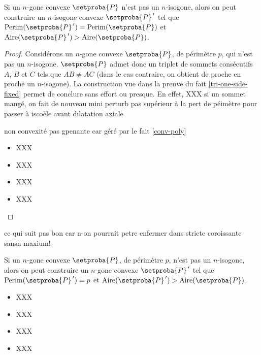 

\begin{fact} \label{iso-poly}
	Si un $n$-gone convexe $\setproba{P}$ n'est pas un $n$-isogone, alors on peut construire un $n$-isogone convexe $\setproba{P}^{\,\prime}$ tel que 
	$\perim{\setproba{P}^{\,\prime}} = \perim{\setproba{P}}$ 
	et 
	$\area{\setproba{P}^{\,\prime}} > \area{\setproba{P}}$.
\end{fact}


\begin{proof}
	Considérons un $n$-gone convexe $\setproba{P}$, de périmètre $p$, qui n'est pas un $n$-isogone. 
	$\setproba{P}$ admet donc un triplet de sommets consécutifs $A$, $B$ et $C$ tels que $AB \neq AC$ (dans le cas contraire, on obtient de proche en proche un $n$-isogone).
	La construction vue dans la preuve du fait \ref{tri-one-side-fixed} permet de conclure sans effort ou presque.
	En effet,
	XXX
	si un sommet mangé, on fait de nouveau mini perturb pas supérieur à la pert de péimètre pour passer à iscoèle avant dilatation axiale
	
	non convexité pas gpenante car géré par le fait \ref{conv-poly}
	\begin{itemize}
		\item XXX

		\item XXX

		\item XXX

		\item XXX
	\end{itemize}
\end{proof}




\begin{remark}
	ce qui suit pas bon car n-on pourrait petre enfermer dans stricte coroissante sansn maxium!
	
	Si un $n$-gone convexe $\setproba{P}$, de périmètre $p$, n'est pas un $n$-isogone, alors on peut construire un $n$-gone convexe $\setproba{P}^{\,\prime}$ tel que $\perim{\setproba{P}^{\,\prime}} = p$ et $\area{\setproba{P}^{\,\prime}} > \area{\setproba{P}}$.
	\begin{itemize}
		\item XXX

		\item XXX

		\item XXX

		\item XXX
	\end{itemize}
\end{remark}


